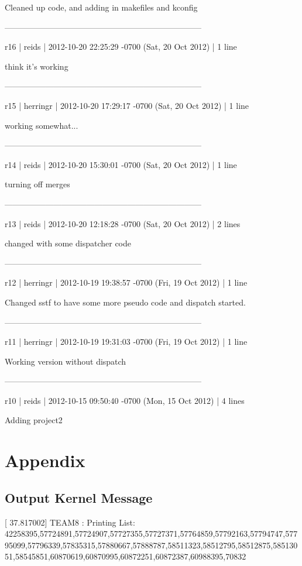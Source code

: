 \documentclass[letterpaper,10pt]{article}
\begin{document}
Cleaned up code, and adding in makefiles and kconfig 

------------------------------------------------------------------------ 

r16 | reids | 2012-10-20 22:25:29 -0700 (Sat, 20 Oct 2012) | 1 line 

think it's working 

------------------------------------------------------------------------ 

r15 | herringr | 2012-10-20 17:29:17 -0700 (Sat, 20 Oct 2012) | 1 line 

working somewhat... 

------------------------------------------------------------------------ 

r14 | reids | 2012-10-20 15:30:01 -0700 (Sat, 20 Oct 2012) | 1 line 

turning off merges 

------------------------------------------------------------------------ 

r13 | reids | 2012-10-20 12:18:28 -0700 (Sat, 20 Oct 2012) | 2 lines 

changed with some dispatcher code 

------------------------------------------------------------------------ 

r12 | herringr | 2012-10-19 19:38:57 -0700 (Fri, 19 Oct 2012) | 1 line 

Changed sstf to have some more pseudo code and dispatch started. 

------------------------------------------------------------------------ 

r11 | herringr | 2012-10-19 19:31:03 -0700 (Fri, 19 Oct 2012) | 1 line 

Working version without dispatch 

------------------------------------------------------------------------ 

r10 | reids | 2012-10-15 09:50:40 -0700 (Mon, 15 Oct 2012) | 4 lines 

Adding project2  

\section{Appendix}

\subsection{Output Kernel Message}
[   37.817002] TEAM8 : Printing List: 42258395,57724891,57724907,57727355,57727371,57764859,57792163,57794747,57795099,57796339,57835315,57880667,57888787,58511323,58512795,58512875,58513051,58545851,60870619,60870995,60872251,60872387,60988395,70832 
\end{document}
